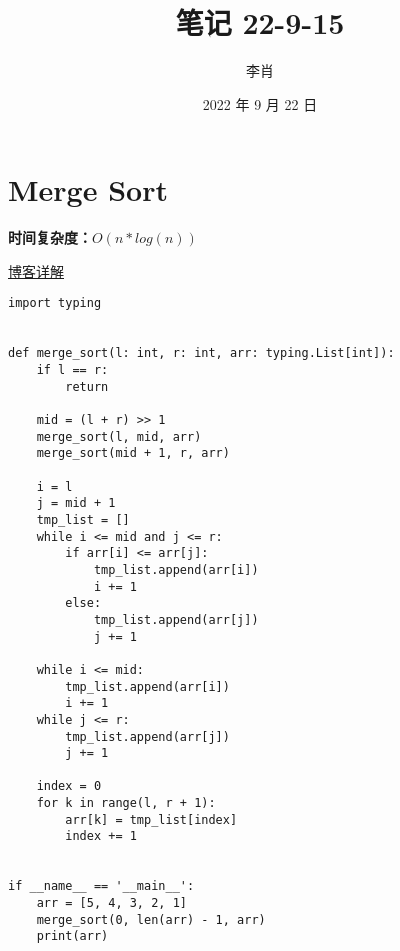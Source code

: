\documentclass[UTF8]{ctexart}
\title{笔记 22-9-15}
\author{李肖}
\date{2022 年 9 月 22 日}
\begin{document}
\maketitle

\section{Merge Sort}
\textbf{时间复杂度：}$O(n*log(n))$

\href{https://blog.csdn.net/qq_41219157/article/details/124096439}{博客详解}

\begin{lstlisting}
import typing


def merge_sort(l: int, r: int, arr: typing.List[int]):
    if l == r:
        return

    mid = (l + r) >> 1
    merge_sort(l, mid, arr)
    merge_sort(mid + 1, r, arr)

    i = l
    j = mid + 1
    tmp_list = []
    while i <= mid and j <= r:
        if arr[i] <= arr[j]:
            tmp_list.append(arr[i])
            i += 1
        else:
            tmp_list.append(arr[j])
            j += 1

    while i <= mid:
        tmp_list.append(arr[i])
        i += 1
    while j <= r:
        tmp_list.append(arr[j])
        j += 1

    index = 0
    for k in range(l, r + 1):
        arr[k] = tmp_list[index]
        index += 1


if __name__ == '__main__':
    arr = [5, 4, 3, 2, 1]
    merge_sort(0, len(arr) - 1, arr)
    print(arr)

\end{lstlisting}
\end{document}
